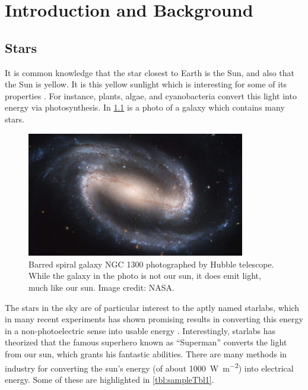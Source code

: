 
\chapter{Introduction and Background}

\section{Stars}

It is common knowledge that the star closest to Earth is the Sun, and also that the Sun is yellow. It is this yellow sunlight which is interesting for some of its properties \cite{scholes2011lessons}. For instance, plants, algae, and cyanobacteria convert this light into energy via photosynthesis. In \ref{fig:firstFig} is a photo of a galaxy which contains many stars.

\begin{figure}[ht]
    \centering
	\includegraphics[width=0.85\textwidth]{figures/sampleFig1.jpg}
	\caption[Barred spiral galaxy NGC 1300]{Barred spiral galaxy NGC 1300 photographed by Hubble telescope. While the galaxy in the photo is not our sun, it does emit light, much like our sun. Image credit: NASA.}
	\label{fig:firstFig}
\end{figure}

The stars in the sky are of particular interest to the aptly named \gls{starlabs}, which in many recent experiments has shown promising results in converting this energy in a non-photoelectric sense into usable energy \cite{allen2019fast}. Interestingly, \gls{starlabs} has theorized that the famous superhero known as ``Superman'' converts the light from our sun, which grants his fantastic abilities. There are many methods in industry for converting the sun's energy (of about \SI{1000}{\watt\per\meter\squared}) into electrical energy. Some of these are highlighted in \ref{tbl:sampleTbl1}.

